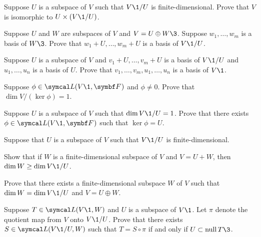 \begin{exercises}
\exercise
Suppose $U$ is a subspace of $V$ such that $V\1/U$ is finite-dimensional. Prove that $V$ is isomorphic to
$U \times (V\1/U)$.


\exercise
Suppose $U$ and $W$ are subspaces of $V$ and $V = U \oplus W\3$. Suppose $w_1, \ldots, w_m$ is a basis of $W\3$. Prove that
$w_1 + U, \ldots, w_m + U$ is a basis of $V\1/U$.


\exercise
Suppose $U$ is a subspace of $V$ and $v_1 + U, \dots, v_m + U$ is a basis of $V\1/U$ and $u_1, \dots, u_n$ is a basis of $U$. Prove that $v_1, \dots, v_m, u_1, \dots, u_n$ is a basis of $V\1$. \label{basisUVmodU}


\exercise
Suppose $\phi \in \L(V\1, \F{})$ and $\phi \ne 0$. Prove that $\dim V \!/\! (\ker \phi) = 1$.


\exercise
Suppose $U$ is a subspace of $V$ such that $\dim V\1/U = 1$. Prove that there exists $\phi \in \L(V\1, \F{})$ such that $\ker \phi = U$.


\exercise
Suppose that $U$ is a subspace of $V$ such that $V\1/U$ is finite-dimensional.
\begin{subtheorem}
\item
Show that if $W$ is a finite-dimensional subspace of $V$ and \mbox{$V = U + W$}, then $\dim W \ge \dim V\1/U$.
\item
Prove that there exists a finite-dimensional subspace $W$ of $V$ such that \mbox{$\dim W = \dim V\1/U$} and \mbox{$V = U \oplus W$}.
\end{subtheorem}
\exercisesubtheoremend


\exercise
Suppose $T \in \L(V\1, W)$ and $U$ is a subspace of $V\1$. Let $\pi$ denote the quotient map from $V$ onto $V\1/U$. Prove that there exists $S \in \L(V\1/U, W)$ such that $T = S \circ \pi$ if and only if $U \subset \ker T\3$. \label{1715}

\end{exercises}
